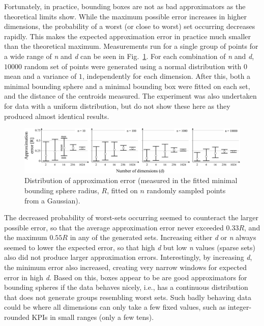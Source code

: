 			Fortunately, in practice, bounding boxes are not as bad approximators as the theoretical limits show.
			While the maximum possible error increases in higher dimensions, the probability of a worst (or close to worst) set occurring decreases rapidly.
			This makes the expected approximation error in practice much smaller than the theoretical maximum.
			Measurements run for a single group of points for a wide range of \textit{n} and \textit{d} can be seen in Fig.~\ref{fig:boxrealsets}.
			For each combination of \textit{n} and \textit{d}, $10000$ random set of points were generated using a normal distribution with $0$ mean and a variance of $1$, independently for each dimension.
			After this, both a minimal bounding sphere and a minimal bounding box were fitted on each set, and the distance of the centroids measured.
			The experiment was also undertaken for data with a uniform distribution, but do not show these here as they produced almost identical results.
			
			\begin{figure}[ht]
				\centering
				\includegraphics[width=\linewidth]{figures/03_quantization/error_whisk/error_whisk.pdf}
				\caption[BBQ approximation error distribution]{Distribution of approximation error (measured in the fitted minimal bounding sphere radius, $R$, fitted on $n$ randomly sampled points from a Gaussian).}
				\label{fig:boxrealsets}
			\end{figure}
			
			The decreased probability of worst-sets occurring seemed to counteract the larger possible error, so that the average approximation error never exceeded $0.33 R$, and the maximum $0.55 R$ in any of the generated sets.
			Increasing either \textit{d} or \textit{n} always seemed to lower the expected error, so that high \textit{d} but low \textit{n} values (sparse sets) also did not produce larger approximation errors.
			Interestingly, by increasing \textit{d}, the minimum error also increased, creating very narrow windows for expected error in high \textit{d}.
			Based on this, boxes appear to be are good approximators for bounding spheres if the data behaves nicely, i.e., has a continuous distribution that does not generate groups resembling worst sets.
			Such badly behaving data could be where all dimensions can only take a few fixed values, such as integer-rounded \acp{KPI} in small ranges (only a few tens).
			
